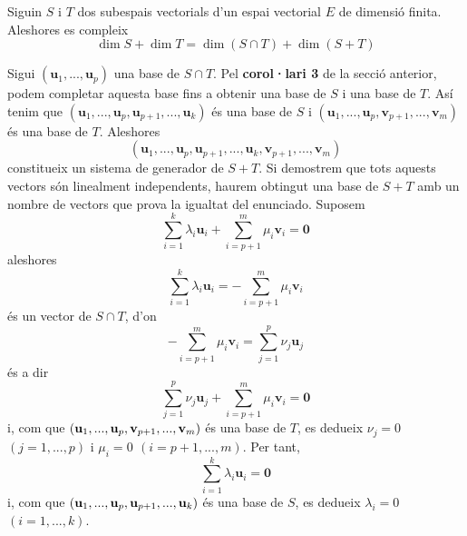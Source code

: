 \begin{teorema}
Siguin $S$ i $T$ dos subespais vectorials d’un espai
vectorial $E$ de dimensió finita. Aleshores es compleix%
\begin{equation*}
\dim S+\dim T=\dim (S\cap T)+\dim (%
S+T)
\end{equation*}

\end{teorema}
\begin{prova}
Sigui $(\mathbf{u}_{1},...,\mathbf{u}_{p})$ una base de $S\cap 
T$. Pel \textbf{corol·lari 3} de la secció anterior, podem
completar aquesta base fins a obtenir una base de $S$ i una base de $%
T$. Así tenim que $(\mathbf{u}_{1},...,\mathbf{u}_{p},%
\mathbf{u}_{p+1},...,\mathbf{u}_{k})$ és una base de $S$ i $(%
\mathbf{u}_{1},...,\mathbf{u}_{p},\mathbf{v}_{p+1},...,\mathbf{v}_{m})$ és
una base de $T$. Aleshores 
\begin{equation*}
(\mathbf{u}_{1},...,\mathbf{u}_{p},\mathbf{u}_{p+1},...,\mathbf{u}_{k},%
\mathbf{v}_{p+1},...,\mathbf{v}_{m})
\end{equation*}%
constitueix un sistema de generador de $S+T$. Si
demostrem que tots aquests vectors són linealment independents,
haurem obtingut una base de $S+T$ amb un nombre de
vectors que prova la igualtat del enunciado. Suposem%
\begin{equation*}
\sum_{i=1}^{k}\lambda _{i}\mathbf{u}_{i}+\sum_{i=p+1}^{m}\mu _{i}\mathbf{v}%
_{i}=\mathbf{0}
\end{equation*}%
aleshores%
\begin{equation*}
\sum_{i=1}^{k}\lambda _{i}\mathbf{u}_{i}=-\sum_{i=p+1}^{m}\mu _{i}\mathbf{v}%
_{i}
\end{equation*}%
és un vector de $S\cap T$, d’on%
\begin{equation*}
-\sum_{i=p+1}^{m}\mu _{i}\mathbf{v}_{i}=\sum_{j=1}^{p}\nu _{j}\mathbf{u}_{j}
\end{equation*}%
és a dir%
\begin{equation*}
\sum_{j=1}^{p}\nu _{j}\mathbf{u}_{j}+\sum_{i=p+1}^{m}\mu _{i}\mathbf{v}_{i}=%
\mathbf{0}
\end{equation*}%
i, com que $(\mathbf{u}_{1},...,\mathbf{u}_{p},\mathbf{v}_{p+1},...,\mathbf{%
v}_{m})$ és una base de $T$, es dedueix $\nu _{j}=0$ $(j=1,...,p)$ i 
$\mu _{i}=0\,\ (i=p+1,...,m)$. Per tant,%
\begin{equation*}
\sum_{i=1}^{k}\lambda _{i}\mathbf{u}_{i}=\mathbf{0}
\end{equation*}%
i, com que $(\mathbf{u}_{1},...,\mathbf{u}_{p},\mathbf{u}_{p+1},...,\mathbf{%
u}_{k})$ és una base de $S$, es dedueix $\lambda _{i}=0$ $%
(i=1,...,k) $.
\end{prova}

